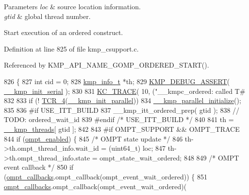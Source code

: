\begin{DoxyParams}{Parameters}
{\em loc} & source location information. \\
\hline
{\em gtid} & global thread number.\\
\hline
\end{DoxyParams}
Start execution of an {\ttfamily ordered} construct. 

Definition at line 825 of file kmp\-\_\-csupport.\-c.



Referenced by K\-M\-P\-\_\-\-A\-P\-I\-\_\-\-N\-A\-M\-E\-\_\-\-G\-O\-M\-P\-\_\-\-O\-R\-D\-E\-R\-E\-D\-\_\-\-S\-T\-A\-R\-T().


\begin{DoxyCode}
826 \{
827     \textcolor{keywordtype}{int} cid = 0;
828     \hyperlink{kmp_8h_a194859801fe16b326efe34501a37c30a}{kmp\_info\_t} *th;
829     \hyperlink{kmp__debug_8h_ad766efc30e33e28634691088e80cdf08}{KMP\_DEBUG\_ASSERT}( \hyperlink{kmp_8h_aee22cd19970207e05e9c86cc0a802f9c}{\_\_kmp\_init\_serial} );
830 
831     \hyperlink{kmp__debug_8h_ab49eefbf8c74cfe98a90ce7ec8864add}{KC\_TRACE}( 10, (\textcolor{stringliteral}{"\_\_kmpc\_ordered: called T#%
832 
833     \textcolor{keywordflow}{if} (! \hyperlink{kmp__os_8h_acd6256e4afba32d90997235fc0a38a74}{TCR\_4}(\hyperlink{kmp_8h_aa23ece0d05f38387c8a8441aaad368df}{\_\_kmp\_init\_parallel}))
834         \hyperlink{kmp_8h_a9c18846c648d84276b9dd5a1d650ab04}{\_\_kmp\_parallel\_initialize}();
835 
836 \textcolor{preprocessor}{#if USE\_ITT\_BUILD}
837 \textcolor{preprocessor}{}    \_\_kmp\_itt\_ordered\_prep( gtid );
838     \textcolor{comment}{// TODO: ordered\_wait\_id}
839 \textcolor{preprocessor}{#endif }\textcolor{comment}{/* USE\_ITT\_BUILD */}\textcolor{preprocessor}{}
840 \textcolor{preprocessor}{}
841     th = \hyperlink{kmp_8h_a8ba907eb5a2568ff55a49a1504cd3624}{\_\_kmp\_threads}[ gtid ];
842 
843 \textcolor{preprocessor}{#if OMPT\_SUPPORT && OMPT\_TRACE}
844 \textcolor{preprocessor}{}    \textcolor{keywordflow}{if} (\hyperlink{ompt-general_8c_a966b31b6d05f79f5495f8d8e71732f68}{ompt\_enabled}) \{
845         \textcolor{comment}{/* OMPT state update */}
846         th->th.ompt\_thread\_info.wait\_id = (uint64\_t) loc;
847         th->th.ompt\_thread\_info.state = ompt\_state\_wait\_ordered;
848 
849         \textcolor{comment}{/* OMPT event callback */}
850         \textcolor{keywordflow}{if} (\hyperlink{ompt-general_8c_a84a29d89cef82c7c38e1ee1f70ec994f}{ompt\_callbacks}.ompt\_callback(ompt\_event\_wait\_ordered)) \{
851             \hyperlink{ompt-general_8c_a84a29d89cef82c7c38e1ee1f70ec994f}{ompt\_callbacks}.ompt\_callback(ompt\_event\_wait\_ordered)(
}
\end{DoxyCode}
